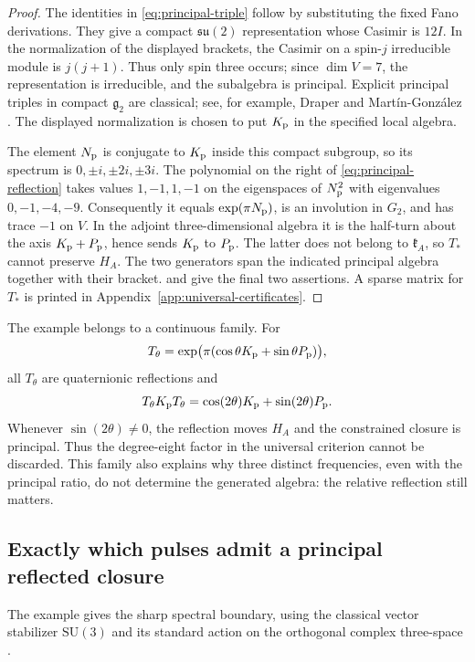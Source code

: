 \documentclass[11pt,a4paper]{article}
\newcommand{\SU}{\mathrm{SU}}
\begin{document}
\begin{proof}
The identities in \eqref{eq:principal-triple} follow by substituting the fixed Fano derivations.  They give a compact $\mathfrak{su}(2)$ representation whose Casimir is $12I$.  In the normalization of the displayed brackets, the Casimir on a spin-$j$ irreducible module is $j(j+1)$.  Thus only spin three occurs; since $\dim V=7$, the representation is irreducible, and the subalgebra is principal.  Explicit principal triples in compact $\mathfrak g_2$ are classical; see, for example, Draper and Mart\'in-Gonz\'alez \cite{DraperMartin2025}. The displayed normalization is chosen to put $K_{\rm p}$ in the specified local algebra.

The element $N_{\rm p}$ is conjugate to $K_{\rm p}$ inside this compact subgroup, so its spectrum is $0,\pm i,\pm2i,\pm3i$.  The polynomial on the right of \eqref{eq:principal-reflection} takes values $1,-1,1,-1$ on the eigenspaces of $N_{\rm p}^2$ with eigenvalues $0,-1,-4,-9$.  Consequently it equals $\exp(\pi N_{\rm p})$, is an involution in $G_2$, and has trace $-1$ on $V$.  In the adjoint three-dimensional algebra it is the half-turn about the axis $K_{\rm p}+P_{\rm p}$, hence sends $K_{\rm p}$ to $P_{\rm p}$.  The latter does not belong to $\mathfrak k_A$, so $T_*$ cannot preserve $H_A$.  The two generators span the indicated principal algebra together with their bracket.   and  give the final two assertions.  A sparse matrix for $T_*$ is printed in Appendix~\ref{app:universal-certificates}.
\end{proof}

The example belongs to a continuous family.  For
\[
T_\theta=\exp\bigl(\pi(\cos\theta K_{\rm p}+\sin\theta P_{\rm p})\bigr),
\]
all $T_\theta$ are quaternionic reflections and
\[
T_\theta K_{\rm p}T_\theta=\cos(2\theta)K_{\rm p}+\sin(2\theta)P_{\rm p}.
\]
Whenever $\sin(2\theta)\ne0$, the reflection moves $H_A$ and the constrained closure is principal.  Thus the degree-eight factor in the universal criterion cannot be discarded.  This family also explains why three distinct frequencies, even with the principal ratio, do not determine the generated algebra: the relative reflection still matters.

\subsection{Exactly which pulses admit a principal reflected closure}
The example gives the sharp spectral boundary, using the classical vector stabilizer $\SU(3)$ and its standard action on the orthogonal complex three-space \cite{DraperMartin2025,Baez2002}.
\end{document}

